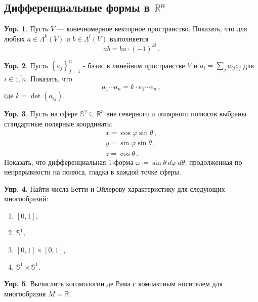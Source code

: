 \documentclass[a4paper, 12pt]{article}
\theoremstyle{definition}
\newtheorem{exercise}{Упр.}
\begin{document}
\subsection{Дифференциальные формы в \({ \mathbb R^{n} }\)}

\begin{exercise}
    Пусть \({ V }\) --- конечномерное векторное пространство. Показать, что для любых \({ a \in \Lambda^{k}(V) }\) и \({ b \in \Lambda^{l}(V) }\) выполняется \[
        ab = ba \cdot (-1)^{kl}\,.
    \]
\end{exercise}

\begin{exercise}
    Пусть \({ \left\{ e_{j} \right\}_{j = 1}^{n} }\) - базис в линейном пространстве \({ V }\) и \({ a_i = \sum_j a_{ij} e_{j} }\) для \({ i \in \overline{1, n} }\). Показать, что \[
        a_1 \cdots a_n = k \cdot e_{1} \cdots e_n\,,
    \] где \({ k = \det (a_{ij}) }\).
\end{exercise}

\begin{exercise}
    Пусть на сфере \({ \mathbb S^2 \subseteq \mathbb R^3 }\) вне северного и полярного полюсов выбраны стандартные полярные координаты \[
        \begin{gathered}
            x = \cos \varphi \sin \theta\,, \\
            y = \sin \varphi \sin \theta\,, \\
            z = \cos \theta\,.
        \end{gathered}
    \] Показать, что дифференциальная \({ 1 }\)-форма \({ \omega \coloneqq \sin \theta\: d\varphi\: d\theta }\), продолженная по непрерывности на полюса, гладка в каждой точке сферы.
\end{exercise}

\begin{exercise}
    Найти числа Бетти и Эйлерову характеристику для следующих многообразий:
    \begin{enumerate}
        \item \({ [0, 1] }\),
        \item \({ \mathbb S^1 }\),
        \item \({ [0, 1] \times [0, 1] }\),
        \item \({ \mathbb S^1 \times \mathbb S^1 }\).
    \end{enumerate}
\end{exercise}

\begin{exercise}
    Вычислить когомологии де Рама с компактным носителем для многообразия \({ M = \mathbb R }\).
\end{exercise}
\end{document}
